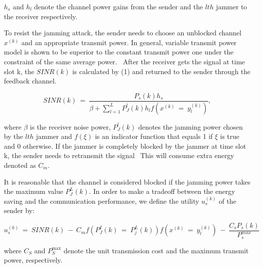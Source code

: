 \documentclass[letterpaper%
, twoside%
, 12pt%
,thesepararticles%
, english%
,creativecommons,hyperref, withAlgo2e%
]{thETS}
\begin{document}
$\displaystyle h_{s}$ and $\displaystyle h_{l}$ denote the channel power gains from the sender and the $\displaystyle lth$ jammer to the receiver respectively. 

To resist the jamming attack, the sender needs to choose an unblocked channel $\displaystyle x^{( k)}$ and an appropriate transmit power. In general, variable transmit power model is shown to be superior to the constant transmit power one under the constraint of the same average power. \ After the receiver gets the signal at time slot k, the $\displaystyle SINR( k)$ is calculated by (1) and returned to the sender through the feedback channel. 

\begin{equation}
SINR( k) \ =\ \frac{P_{s}( k) h_{s}}{\beta +\sum ^{L}_{l=1} P^{l}_{J}( k) h_{l} f\left( x^{( k)} \ =\ y^{( k)}_{l}\right)},
\end{equation}

 where $\displaystyle \beta $ is the receiver noise power, $\displaystyle P^{l}_{J}( k)$ denotes the jamming power chosen by the $\displaystyle lth$ jammer and $\displaystyle f( \xi )$ is an indicator function that equals 1 if $\displaystyle \xi $ is true and 0 otherwise. If the jammer is completely blocked by the jammer at time slot k, the sender needs to retransmit the signal \ This will consume extra energy denoted as $\displaystyle C_{m} .$

It is reasonable that the channel is considered blocked if the jamming power takes the maximum value $\displaystyle P^{L}_{J}( k) .$ In order to make a tradeoff between the energy saving and the communication performance, we define the utility $\displaystyle u^{( k)}_{s}$ of the sender by: 

\begin{equation}
u^{( k)}_{s} \ =\ SINR( k) \ -\ C_{m} f\left( P^{I}_{J}( k) \ =\ P^{L}_{j}( k)\right) f\left( x^{( k)} \ =\ y^{( k)}_{l}\right) \ -\ \frac{C_{s} P_{s}( k)}{P^{max}_{s}}
\end{equation}

where $\displaystyle C_{S}$ and $\displaystyle P^{\max}_{S}$ denote the unit transmission cost and the maximum transmit power, respectively. 
\end{document}
